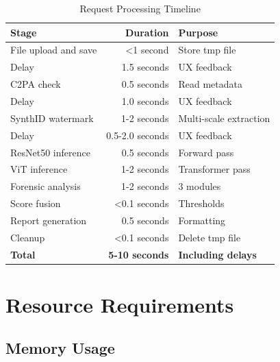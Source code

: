 \documentclass[12pt,a4paper]{book}
\begin{document}
\begin{itemize}
\begin{table}[H]
\centering
\captionsetup{justification=centering}
\caption{Request Processing Timeline}
\begin{tabular}{|l|r|p{3cm}|}
\hline
\textbf{Stage} & \textbf{Duration} & \textbf{Purpose} \\
\hline
File upload and save & <1 second & Store tmp file \\
\hline
Delay & 1.5 seconds & UX feedback \\
\hline
C2PA check & 0.5 seconds & Read metadata \\
\hline
Delay & 1.0 seconds & UX feedback \\
\hline
SynthID watermark & 1-2 seconds & Multi-scale extraction \\
\hline
Delay & 0.5-2.0 seconds & UX feedback \\
\hline
ResNet50 inference & 0.5 seconds & Forward pass \\
\hline
ViT inference & 1-2 seconds & Transformer pass \\
\hline
Forensic analysis & 1-2 seconds & 3 modules \\
\hline
Score fusion & <0.1 seconds & Thresholds \\
\hline
Report generation & 0.5 seconds & Formatting \\
\hline
Cleanup & <0.1 seconds & Delete tmp file \\
\hline
\textbf{Total} & \textbf{5-10 seconds} & \textbf{Including delays} \\
\hline
\end{tabular}
\end{table}

\section{Resource Requirements}

\subsection{Memory Usage}


\end{itemize}
\end{document}
